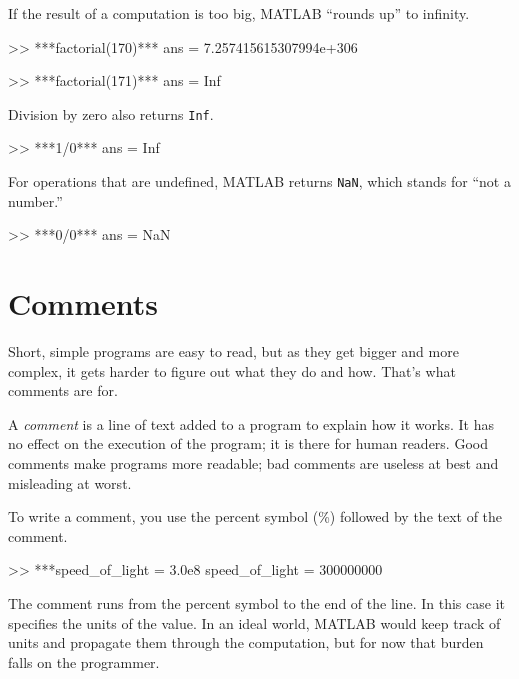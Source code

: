 If the result of a computation is too big, MATLAB ``rounds up''
to \mbox{infinity}.


\begin{code}
>> ***factorial(170)***
ans = 7.257415615307994e+306

>> ***factorial(171)***
ans = Inf
\end{code}

Division by zero also returns \lstinline{Inf}.

\begin{code}
>> ***1/0***
ans = Inf
\end{code}


For operations that are undefined, MATLAB returns \lstinline{NaN},
which stands for ``not a number.''


\begin{code}
>> ***0/0***
ans = NaN
\end{code}


\section{Comments}

Short, simple programs are easy to read, but as they get bigger and more complex, it gets harder to figure out what they do and how.  That's what comments are for.

A \emph{comment} is a line of text added to a program to explain how it works. It has no effect on the execution of the program; it is there for human readers.  
Good comments make programs more readable; bad comments are useless at best and misleading at worst.

To write a comment, you use the percent symbol (\%) followed by the text of the comment.
\newpage
{}

\begin{code}
>> ***speed_of_light = 3.0e8     %
speed_of_light = 300000000
\end{code}

The comment runs from the percent symbol to the end of the line.
In this case it specifies the units of the value.  In an ideal world,
MATLAB would keep track of units and propagate them through the
computation, but for now that burden falls on the programmer.

